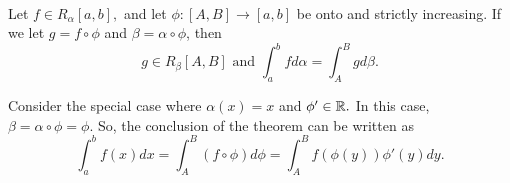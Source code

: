 \begin{theorem} \leavevmode \\
    \label{Thm6.19}
    Let $f \in R_\alpha[a,b],$ and let $\phi: [A,B]\to [a,b]$ be onto and strictly increasing. If we let $g = f \circ \phi$ and $\beta = \alpha \circ \phi$, then
    $$g \in R_\beta[A,B] \text{ and } \int_a^bfd \alpha = \int_A^Bg d \beta.$$
\end{theorem}

\begin{remark}
    Consider the special case where $\alpha(x) = x$ and $\phi' \in \mathbb{R}.$ In this case, $\beta = \alpha \circ \phi = \phi.$ So, the conclusion of the theorem can be written as
    $$\int_a^bf(x)dx = \int_A^B(f\circ \phi)d\phi = \int_A^Bf(\phi(y))\phi'(y)dy.$$
\end{remark}

